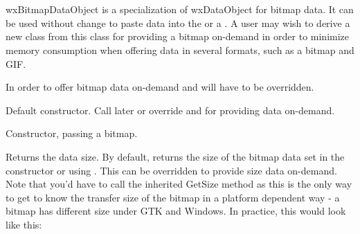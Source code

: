 \section{}\label{wxbitmapdataobject}

wxBitmapDataObject is a specialization of wxDataObject for bitmap data. It can be
used without change to paste data into the 
or a . A user may wish to derive a new class
from this class for providing a bitmap on-demand in order to minimize memory consumption
when offering data in several formats, such as a bitmap and GIF.

In order to offer bitmap data on-demand  
and  will have to be overridden.






\label{wxbitmapdataobjectwxbitmapdataobject}


Default constructor. Call  later
or override  and 
 for providing data on-demand.


Constructor, passing a bitmap.

\label{wxbitmapdataobjectgetsize}


Returns the data size. By default, returns the size of the bitmap data
set in the constructor or using .
This can be overridden to provide size data on-demand. Note that you'd
have to call the inherited GetSize method as this is the only way
to get to know the transfer size of the bitmap in a platform dependent
way - a bitmap has different size under GTK and Windows. In practice, 
this would look like this:

